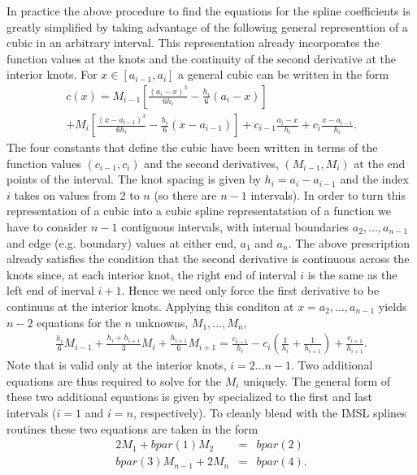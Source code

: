 In practice the above procedure to find the equations for the spline
coefficients is greatly simplified by taking advantage of the following general
representtion of a cubic in an arbitrary interval. This representation already
incorporates the function values at the knots and the continuity of the second
derivative at the interior knots. For    $ x \in [a_{i-1},a_i] $ a general cubic
can be written in the form 
\begin{multline}
 c(x) = M_{i-1} \left [ \frac{(a_i-x)^3}{6h_i} -\frac{h_i}{6}(a_i-x) \right ]\\
 + M_i \left [\frac{(x-a_{i-1})^3}{6 h_i} -\frac{h_i}{6}(x-a_{i-1}) \right ]  
 +c_{i-1}\frac{a_i - x}{h_i}
 +c_i\frac{x-a_{i-1}}{h_i} \label{eqa}.
\end{multline}
The four constants that define the cubic have been written in terms of the
function values $(c_{i-1},c_i)$ and the second derivatives, $(M_{i-1}, M_i)$  at
the end points of the interval. The knot spacing is given by $h_i = a_i -
a_{i-1} $ and the index $i$ takes on values from 2 to $n$ (so there are $n-1$
intervals). In order to turn this representation of a cubic into a cubic spline
representatstion of a function we have to consider $n-1$  contiguous intervals,
with internal boundaries $a_2,\ldots, a_{n-1} $ and edge (e.g. boundary) values
at either  end, $a_1$ and $a_n$. The above prescription already satisfies the
condition that the second  derivative is continuous across the knots since, at
each interior knot, the right end of interval $i$ is the same as the left end of
inerval $i+1$. Hence we need only force the first derivative to be continuus at
the interior knots.  Applying this conditon at $x = a_2, \ldots,a_{n-1} $ yields
$n-2$  equations  for the $n$ unknowns, $M_1,\ldots,M_n$,
\begin{eqnarray}
 \frac{h_i}{6}M_{i-1} + \frac{h_i+h_{i+1}}{3} M_i +
 \frac{h_{i+1}}{6} M_{i+1} = \frac{c_{i-1}}{h_i}
 -c_i(\frac{1}{h_i} +\frac{1}{h_{i+1}})
 +\frac{c_{i+1}}{h_{i+1}}
 \label{eqbb}.
\end{eqnarray}
Note that  is valid only at the interior knots, $i=2\ldots n-1 $.
Two additional equations are thus required to solve for the $ M_i $ uniquely.
The general form of these two additional equations is given by 
specialized to the first and last intervals ($i =1$ and $i = n$, respectively).
To cleanly blend with the IMSL splines routines these two equations are taken in
the form
\begin{eqnarray}
 2M_1 +bpar(1)M_2&  = &  bpar(2)              \label{eqc}\\
 bpar(3)M_{n-1}+2M_n & =& bpar(4)             \label{eqd}.
\end{eqnarray}
